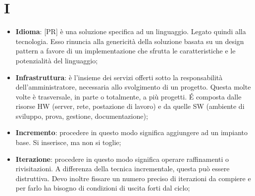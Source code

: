 %
%
%

\section{I}

\begin{itemize}
	\item \textbf{Idioma}: [PR] è una soluzione specifica ad un linguaggio. Legato quindi alla tecnologia. Esso rinuncia alla genericità della soluzione basata su un design pattern a favore di un implementazione che sfrutta le caratteristiche e le potenzialità del linguaggio;
	\item \textbf{Infrastruttura}: è l'insieme dei servizi offerti sotto la responsabilità dell'amministratore, necessaria allo svolgimento di un progetto. Questa molte volte è trasversale, in parte o totalmente, a più progetti. \'E composta dalle risorse HW (server, rete, postazione di lavoro) e da quelle SW (ambiente di sviluppo, prova, gestione, documentazione);
	\item \textbf{Incremento}: procedere in questo modo significa aggiungere ad un impianto base. Si inserisce, ma non si toglie;

	\item \textbf{Iterazione}: procedere in questo modo significa operare raffinamenti o rivisitazioni. A differenza della tecnica incrementale, questa può essere distruttiva. \newline
Devo inoltre fissare un numero preciso di iterazioni da compiere e per farlo ha bisogno di condizioni di uscita forti dal ciclo;

\end{itemize}